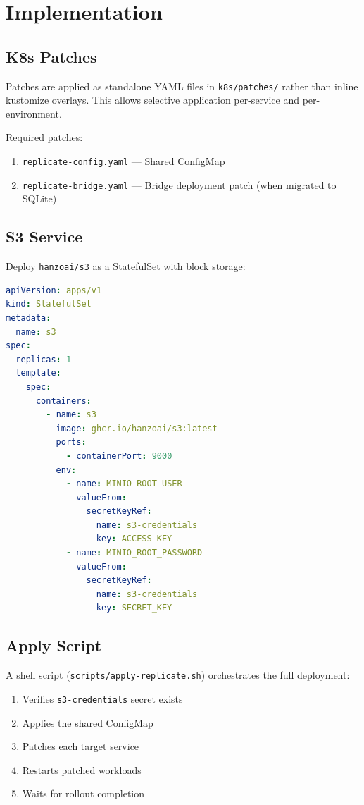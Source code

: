 \section{Implementation}


\subsection{K8s Patches}

Patches are applied as standalone YAML files in
\texttt{k8s/patches/} rather than inline kustomize overlays.
This allows selective application per-service and per-environment.

Required patches:
\begin{enumerate}
\item \texttt{replicate-config.yaml} --- Shared ConfigMap
\item \texttt{replicate-bridge.yaml} --- Bridge deployment patch
  (when migrated to SQLite)
\end{enumerate}

\subsection{S3 Service}

Deploy \texttt{hanzoai/s3} as a StatefulSet with block storage:

\begin{lstlisting}[language=yaml,caption={S3 service (MinIO)}]
apiVersion: apps/v1
kind: StatefulSet
metadata:
  name: s3
spec:
  replicas: 1
  template:
    spec:
      containers:
        - name: s3
          image: ghcr.io/hanzoai/s3:latest
          ports:
            - containerPort: 9000
          env:
            - name: MINIO_ROOT_USER
              valueFrom:
                secretKeyRef:
                  name: s3-credentials
                  key: ACCESS_KEY
            - name: MINIO_ROOT_PASSWORD
              valueFrom:
                secretKeyRef:
                  name: s3-credentials
                  key: SECRET_KEY
\end{lstlisting}

\subsection{Apply Script}

A shell script (\texttt{scripts/apply-replicate.sh}) orchestrates
the full deployment:

\begin{enumerate}
\item Verifies \texttt{s3-credentials} secret exists
\item Applies the shared ConfigMap
\item Patches each target service
\item Restarts patched workloads
\item Waits for rollout completion
\end{enumerate}

